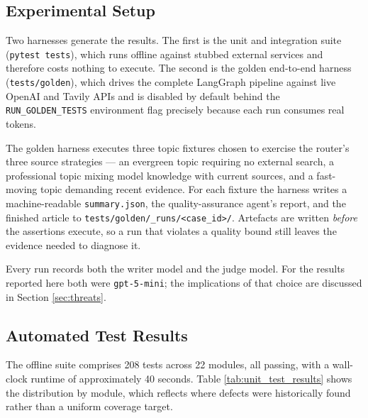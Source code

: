 \subsection{Experimental Setup}
\label{sec:eval_setup}

Two harnesses generate the results. The first is the unit and integration suite
(\texttt{pytest tests}), which runs offline against stubbed external services
and therefore costs nothing to execute. The second is the golden end-to-end
harness (\texttt{tests/golden}), which drives the complete LangGraph pipeline
against live OpenAI and Tavily APIs and is disabled by default behind the
\texttt{RUN\_GOLDEN\_TESTS} environment flag precisely because each run consumes
real tokens.

The golden harness executes three topic fixtures chosen to exercise the router's
three source strategies --- an evergreen topic requiring no external search, a
professional topic mixing model knowledge with current sources, and a
fast-moving topic demanding recent evidence. For each fixture the harness writes
a machine-readable \texttt{summary.json}, the quality-assurance agent's report,
and the finished article to \texttt{tests/golden/\_runs/<case\_id>/}. Artefacts
are written \emph{before} the assertions execute, so a run that violates a
quality bound still leaves the evidence needed to diagnose it.

Every run records both the writer model and the judge model. For the results
reported here both were \texttt{gpt-5-mini}; the implications of that choice are
discussed in Section \ref{sec:threats}.

\subsection{Automated Test Results}

The offline suite comprises 208 tests across 22 modules, all passing, with a
wall-clock runtime of approximately 40 seconds. Table
\ref{tab:unit_test_results} shows the distribution by module, which reflects
where defects were historically found rather than a uniform coverage target.

